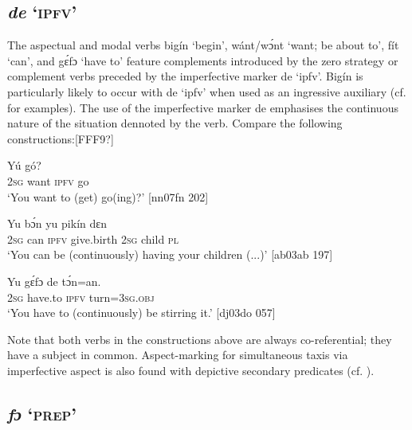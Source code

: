\subsection{\textit{de} ‘\textsc{ipfv}’}\label{sec:10.5.3}

The aspectual and modal verbs bigín ‘begin’, wánt/wɔ́nt ‘want; be about to’, fít ‘can’, and gɛ́fɔ ‘have to’ feature complements introduced by the zero strategy or complement verbs preceded by the imperfective marker de ‘ipfv’. Bigín is particularly likely to occur with de ‘ipfv’ when used as an ingressive auxiliary (cf.  for examples). The use of the imperfective marker de emphasises the continuous nature of the situation dennoted by the verb. Compare the following constructions:[FFF9?]


\ea%
    \label{ex:key:1381}





        \textstylePichiglossZchn{} Yú   gó?\\
\textsc{2sg}  want  \textsc{ipfv}  go\\

\glt ‘You want to (get) go(ing)?’ [nn07fn 202]
\z


\ea%
    \label{ex:key:1382}
\gll
Yu     bɔ́n\textstylePichiexamplebold{}     yu  pikín  dɛn\\
\textsc{2sg}  can  \textsc{ipfv}  give.birth  \textsc{2sg}  child  \textsc{pl}\\

\glt ‘You can be (continuously) having your children (...)’ [ab03ab 197]
\z


\ea%
    \label{ex:key:1383}
    \gll Yu  gɛ́fɔ    de  tɔ́n=an.\\
\textsc{2sg}  have.to  \textsc{ipfv}  turn=\textsc{3sg.obj}\\

\glt ‘You have to (continuously) be stirring it.’ [dj03do 057]
\z

Note that both verbs in the constructions above are always co-referential; they have a subject in common. Aspect-marking for simultaneous taxis via imperfective aspect is also found with depictive secondary predicates (cf. ).

\subsection{\textit{fɔ} ‘\textsc{prep}’} 

